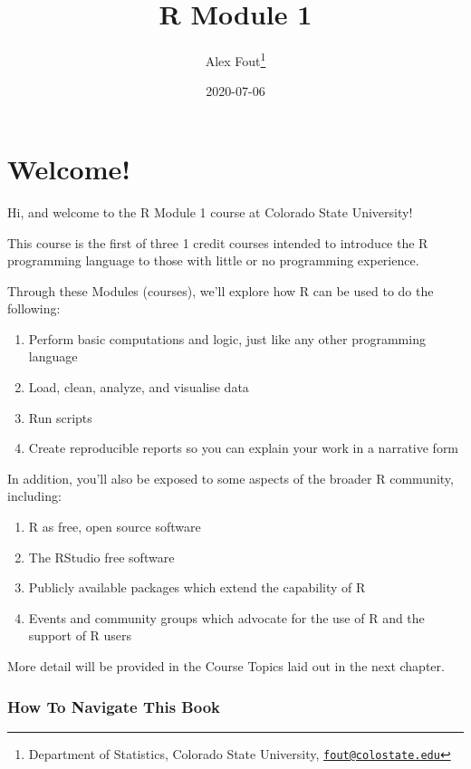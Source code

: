 \documentclass[
]{article}
\title{R Module 1}
\author{Alex Fout\footnote{Department of Statistics, Colorado State University, \href{mailto:fout@colostate.edu}{\nolinkurl{fout@colostate.edu}}}}
\date{2020-07-06}
\providecommand{\tightlist}{%
  \setlength{\itemsep}{0pt}\setlength{\parskip}{0pt}}
\begin{document}
\maketitle

{
\setcounter{tocdepth}{2}
\tableofcontents
}
\hypertarget{welcome}{%
\section{Welcome!}\label{welcome}}

Hi, and welcome to the R Module 1 course at Colorado State University!

This course is the first of three 1 credit courses intended to introduce the R programming language to those with little or no programming experience.

Through these Modules (courses), we'll explore how R can be used to do the following:

\begin{enumerate}
\def\labelenumi{\arabic{enumi}.}
\tightlist
\item
  Perform basic computations and logic, just like any other programming language
\item
  Load, clean, analyze, and visualise data
\item
  Run scripts
\item
  Create reproducible reports so you can explain your work in a narrative form
\end{enumerate}

In addition, you'll also be exposed to some aspects of the broader R community, including:

\begin{enumerate}
\def\labelenumi{\arabic{enumi}.}
\tightlist
\item
  R as free, open source software
\item
  The RStudio free software
\item
  Publicly available packages which extend the capability of R
\item
  Events and community groups which advocate for the use of R and the support of R users
\end{enumerate}

More detail will be provided in the Course Topics laid out in the next chapter.

\hypertarget{how-to-navigate-this-book}{%
\subsubsection{How To Navigate This Book}\label{how-to-navigate-this-book}}
\end{document}
